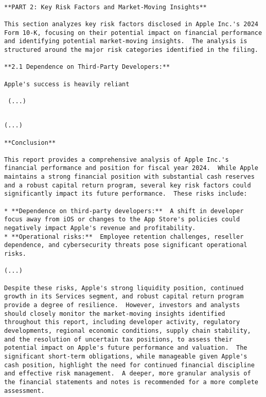 \begin{verbatim}

**PART 2: Key Risk Factors and Market-Moving Insights**

This section analyzes key risk factors disclosed in Apple Inc.'s 2024 Form 10-K, focusing on their potential impact on financial performance and identifying potential market-moving insights.  The analysis is structured around the major risk categories identified in the filing.

**2.1 Dependence on Third-Party Developers:**

Apple's success is heavily reliant 

 (...) 

\end{verbatim}



\begin{verbatim}

(...)

**Conclusion**

This report provides a comprehensive analysis of Apple Inc.'s financial performance and position for fiscal year 2024.  While Apple maintains a strong financial position with substantial cash reserves and a robust capital return program, several key risk factors could significantly impact its future performance.  These risks include:

* **Dependence on third-party developers:**  A shift in developer focus away from iOS or changes to the App Store's policies could negatively impact Apple's revenue and profitability.
* **Operational risks:**  Employee retention challenges, reseller dependence, and cybersecurity threats pose significant operational risks.

(...)

Despite these risks, Apple's strong liquidity position, continued growth in its Services segment, and robust capital return program provide a degree of resilience.  However, investors and analysts should closely monitor the market-moving insights identified throughout this report, including developer activity, regulatory developments, regional economic conditions, supply chain stability, and the resolution of uncertain tax positions, to assess their potential impact on Apple's future performance and valuation.  The significant short-term obligations, while manageable given Apple's cash position, highlight the need for continued financial discipline and effective risk management.  A deeper, more granular analysis of the financial statements and notes is recommended for a more complete assessment.

\end{verbatim}

